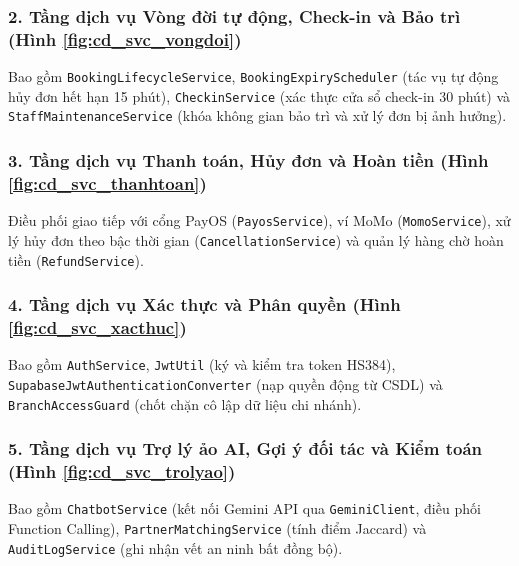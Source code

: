 
\subsubsection{2. Tầng dịch vụ Vòng đời tự động, Check-in và Bảo trì (Hình \ref{fig:cd_svc_vongdoi})}
Bao gồm \texttt{BookingLifecycleService}, \texttt{BookingExpiryScheduler} (tác vụ tự động hủy đơn hết hạn 15 phút), \texttt{CheckinService} (xác thực cửa sổ check-in 30 phút) và \texttt{StaffMaintenanceService} (khóa không gian bảo trì và xử lý đơn bị ảnh hưởng).


\subsubsection{3. Tầng dịch vụ Thanh toán, Hủy đơn và Hoàn tiền (Hình \ref{fig:cd_svc_thanhtoan})}
Điều phối giao tiếp với cổng PayOS (\texttt{PayosService}), ví MoMo (\texttt{MomoService}), xử lý hủy đơn theo bậc thời gian (\texttt{CancellationService}) và quản lý hàng chờ hoàn tiền (\texttt{RefundService}).


\subsubsection{4. Tầng dịch vụ Xác thực và Phân quyền (Hình \ref{fig:cd_svc_xacthuc})}
Bao gồm \texttt{AuthService}, \texttt{JwtUtil} (ký và kiểm tra token HS384), \texttt{SupabaseJwtAuthenticationConverter} (nạp quyền động từ CSDL) và \texttt{BranchAccessGuard} (chốt chặn cô lập dữ liệu chi nhánh).


\subsubsection{5. Tầng dịch vụ Trợ lý ảo AI, Gợi ý đối tác và Kiểm toán (Hình \ref{fig:cd_svc_trolyao})}
Bao gồm \texttt{ChatbotService} (kết nối Gemini API qua \texttt{GeminiClient}, điều phối Function Calling), \texttt{PartnerMatchingService} (tính điểm Jaccard) và \texttt{AuditLogService} (ghi nhận vết an ninh bất đồng bộ).

